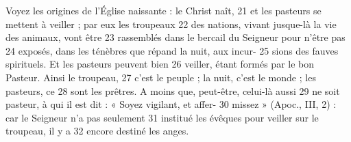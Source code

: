 Voyez les origines de l'Église naissante : le Christ naît,	 
21	 	et les pasteurs se mettent à veiller ; par eux les troupeaux	 
22	 	des nations, vivant jusque-là la vie des animaux, vont être	 
23	 	rassemblés dans le bercail du Seigneur pour n'être pas	 
24	 	exposés, dans les ténèbres que répand la nuit, aux incur-	 
25	 	sions des fauves spirituels. Et les pasteurs peuvent bien	 
26	 	veiller, étant formés par le bon Pasteur. Ainsi le troupeau,	 
27	 	c'est le peuple ; la nuit, c'est le monde ; les pasteurs, ce	 
28	 	sont les prêtres. A moins que, peut-être, celui-là aussi	 
29	 	ne soit pasteur, à qui il est dit : « Soyez vigilant, et affer-	 
30	 	missez » (Apoc., III, 2) : car le Seigneur n'a pas seulement	 
31	 	institué les évêques pour veiller sur le troupeau, il y a	 
32	 	encore destiné les anges.